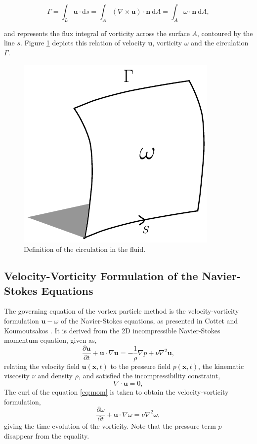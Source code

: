 	\begin{equation}
	\Gamma = \int_L\mathbf{u}\cdot \mathrm{d}s= \int_A (\nabla \times \mathbf{u}) \cdot \mathbf{n}\ \mathrm{d}A = \int_A\omega\cdot\mathbf{n}\ \mathrm{d}A,
	\label{eq:definitionOfCirculation}
	\end{equation}

and represents the flux integral of vorticity across the surface $A$, contoured by the line $s$. Figure \ref{fig:vorticityCirculation} depicts this relation of velocity $\mathbf{u}$, vorticity $\omega$ and the circulation $\Gamma$.

	\begin{figure}[!h]
	\centering
	\includegraphics[width=0.3\linewidth]{./figures/lagrangian/vorticityCirculation_updated.pdf}
	\caption{Definition of the circulation in the fluid.}
	\label{fig:vorticityCirculation}
	\end{figure}

 
\subsection{Velocity-Vorticity Formulation of the Navier-Stokes Equations}
The governing equation of the vortex particle method is the velocity-vorticity formulation $\mathbf{u}-\omega$ of the Navier-Stokes equations, as presented in Cottet and Koumoutsakos \cite{Cottet2000a}. It is derived from the 2D incompressible Navier-Stokes momentum equation, given as,
	\begin{equation}
	\frac{\partial \mathbf{u}}{\partial t} + \mathbf{u}\cdot\nabla\mathbf{u} = - \frac{1}{\rho} \nabla p + \nu \nabla^2\mathbf{u},
	\label{eq:mom}
	\end{equation}
relating the velocity field $\mathbf{u}\left(\mathbf{x},t\right)$ to the pressure field $p\left(\mathbf{x},t\right)$, the kinematic viscosity $\nu$ and density $\rho$, and satisfied the incompressibility constraint,
	\begin{equation}
	\nabla\cdot\mathbf{u} = 0,
	\label{eq:la_ic}
	\end{equation}
The curl of the equation \ref{eq:mom} is taken to obtain the velocity-vorticity formulation, 
	\begin{equation}
	\frac{\partial \omega}{\partial t} + \mathbf{u}\cdot\nabla\omega = \nu \nabla^2 \omega,
	\label{eq:la_vteq}
	\end{equation}
giving the time evolution of the vorticity. Note that the pressure term $p$ disappear  from the equality.

